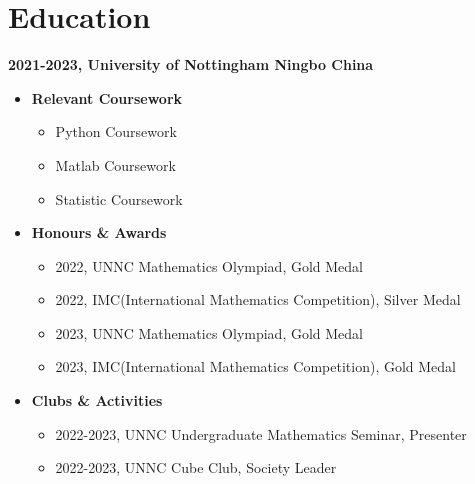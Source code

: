 \documentclass{article}
\begin{document}
\section*{Education}
\textbf{2021-2023, University of Nottingham Ningbo China}
\begin{itemize}
    \item \textbf{Relevant Coursework}
    \begin{itemize}
        \item Python Coursework
        \item Matlab Coursework
        \item Statistic Coursework
    \end{itemize}
    \item \textbf{Honours \& Awards}
    \begin{itemize}
        \item 2022, UNNC Mathematics Olympiad, Gold Medal
        \item 2022, IMC(International Mathematics Competition), Silver Medal
        \item 2023, UNNC Mathematics Olympiad, Gold Medal
        \item 2023, IMC(International Mathematics Competition), Gold Medal
    \end{itemize}
    \item \textbf{Clubs \& Activities}
    \begin{itemize}
        \item 2022-2023, UNNC Undergraduate Mathematics Seminar, Presenter
        \item 2022-2023, UNNC Cube Club, Society Leader
    \end{itemize}
\end{itemize}
\end{document}
